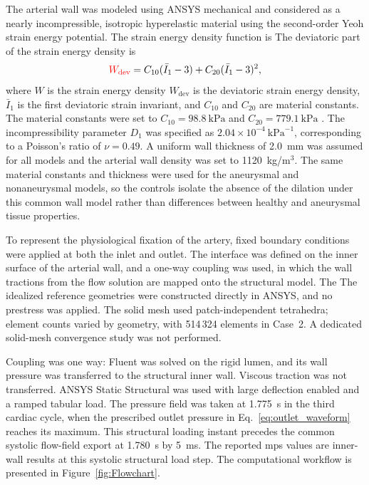 \documentclass[12pt,a4paper]{article}
\newcommand{\cfdrevision}[1]{#1} %
\newcommand{\FSI}{\ac{fsi}\xspace}
\newcommand{\MPS}{\ac{mps}\xspace}
\theoremstyle{definition}
\numberwithin{equation}{section}
\providecommand{\DIFaddtex}[1]{{\protect\color{blue} \sf #1}} %
\providecommand{\DIFdeltex}[1]{{\protect\color{red} \scriptsize #1}} %
\providecommand{\DIFaddbegin}{} %
\providecommand{\DIFaddend}{} %
\providecommand{\DIFdelbegin}{} %
\providecommand{\DIFdelend}{} %
\providecommand{\DIFadd}[1]{\texorpdfstring{\DIFaddtex{#1}}{#1}} %
\providecommand{\DIFdel}[1]{\texorpdfstring{\DIFdeltex{#1}}{}} %
\newcommand{\DIFscaledelfig}{0.5}
\newlength{\DIFdelgraphicswidth} %
\newlength{\DIFdelgraphicsheight} %
\newcommand{\DIFaddincludegraphics}[2][]{{\color{blue}\fbox{\DIFOincludegraphics[#1]{#2}}}} %
\newcommand{\DIFdelincludegraphics}[2][]{%
\sbox{\DIFdelgraphicsbox}{\DIFOincludegraphics[#1]{#2}}%
\settoboxwidth{\DIFdelgraphicswidth}{\DIFdelgraphicsbox} %
\settoboxtotalheight{\DIFdelgraphicsheight}{\DIFdelgraphicsbox} %
\scalebox{\DIFscaledelfig}{%
\parbox[b]{\DIFdelgraphicswidth}{\usebox{\DIFdelgraphicsbox}\\[-\baselineskip] \rule{\DIFdelgraphicswidth}{0em}}\llap{\resizebox{\DIFdelgraphicswidth}{\DIFdelgraphicsheight}{%
\setlength{\unitlength}{\DIFdelgraphicswidth}%
\begin{picture}(1,1)%
\thicklines\linethickness{2pt} %
{\color[rgb]{1,0,0}\put(0,0){\framebox(1,1){}}}%
{\color[rgb]{1,0,0}\put(0,0){\line( 1,1){1}}}%
{\color[rgb]{1,0,0}\put(0,1){\line(1,-1){1}}}%
\end{picture}%
}\hspace*{3pt}}} %
} %
\DeclareRobustCommand{\DIFaddbegin}{\DIFOaddbegin \let\includegraphics\DIFaddincludegraphics} %
\DeclareRobustCommand{\DIFaddend}{\DIFOaddend \let\includegraphics\DIFOincludegraphics} %
\DeclareRobustCommand{\DIFdelbegin}{\DIFOdelbegin \let\includegraphics\DIFdelincludegraphics} %
\DeclareRobustCommand{\DIFdelend}{\DIFOaddend \let\includegraphics\DIFOincludegraphics} %
\begin{document}
The arterial wall was modeled using ANSYS mechanical and considered as a nearly incompressible, isotropic hyperelastic material using the second-order Yeoh strain energy potential. \DIFdelbegin \DIFdel{The strain energy density function is
}%
\DIFdelend \DIFaddbegin \DIFadd{\cfdrevision{The deviatoric part of the strain energy density is}
}\begin{equation}
\textcolor{red}{W_{\mathrm{dev}}} = C_{10}(\bar{I}_1 - 3) + C_{20}(\bar{I}_1 - 3)^2,
\label{eq:yeoh}
\end{equation}\DIFaddend 
where \DIFdelbegin \DIFdel{\(W\) is the strain energy density}\DIFdelend \DIFaddbegin \DIFadd{\cfdrevision{\(W_{\mathrm{dev}}\) is the deviatoric strain energy density}}\DIFaddend , \(\bar{I}_1\) is the first deviatoric strain invariant, and \(C_{10}\) and \(C_{20}\) are material constants. The material constants were set to \(C_{10} = 98.8~\text{kPa}\) and \(C_{20} = 779.1~\text{kPa}\) \cite{zhu2025combined}. The incompressibility parameter \(D_1\) was specified as \(2.04 \times 10^{-4}~\text{kPa}^{-1}\), corresponding to a Poisson's ratio of \(\nu = 0.49\). A uniform wall thickness of 2.0~mm was assumed for all models and the arterial wall density was set to 1120~kg/m\(^3\). \DIFaddbegin \DIFadd{\cfdrevision{The same material constants and thickness were used for the aneurysmal and nonaneurysmal models, so the controls isolate the absence of the dilation under this common wall model rather than differences between healthy and aneurysmal tissue properties.}
}\DIFaddend 

To represent the physiological fixation of the artery, fixed boundary conditions were applied at both the inlet and outlet. \DIFdelbegin \DIFdel{The }%
\DIFdel{interface was defined on the inner surface of the arterial wall, and a one-way }%
\DIFdel{coupling was used, in which the wall tractions from the flow solution are mapped onto the structural model. The }\DIFdelend \DIFaddbegin \DIFadd{\cfdrevision{The idealized reference geometries were constructed directly in ANSYS, and no prestress was applied. The solid mesh used patch-independent tetrahedra; element counts varied by geometry, with 514\,324 elements in Case~2. A dedicated solid-mesh convergence study was not performed.}
}

\DIFadd{\cfdrevision{Coupling was one way: Fluent was solved on the rigid lumen, and its wall pressure was transferred to the structural inner wall. Viscous traction was not transferred. ANSYS Static Structural was used with large deflection enabled and a ramped tabular load. The pressure field was taken at 1.775~s in the third cardiac cycle, when the prescribed outlet pressure in Eq.~\eqref{eq:outlet_waveform} reaches its maximum. This structural loading instant precedes the common systolic flow-field export at 1.780~s by 5~ms. The reported \MPS values are inner-wall results at this systolic structural load step.} The }\DIFaddend computational workflow is presented in Figure~\ref{fig:Flowchart}.
\end{document}
